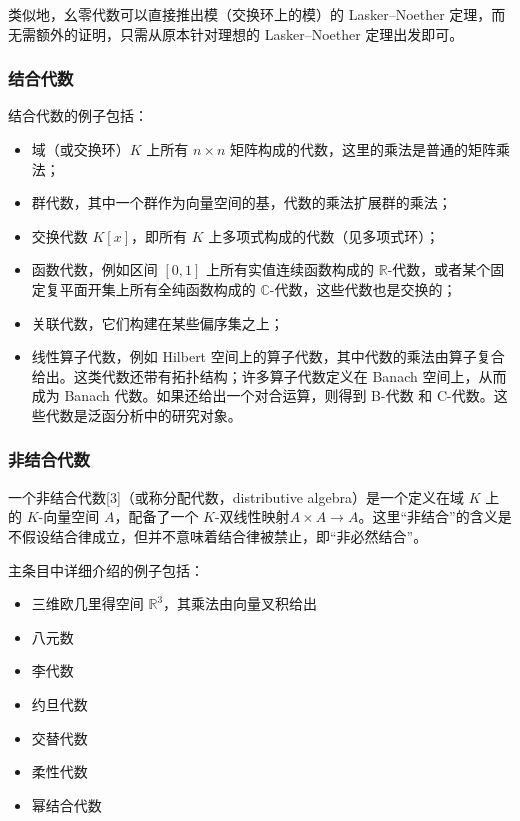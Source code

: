 类似地，幺零代数可以直接推出模（交换环上的模）的 Lasker–Noether 定理，而无需额外的证明，只需从原本针对理想的 Lasker–Noether 定理出发即可。
\subsubsection{结合代数}
结合代数的例子包括：
\begin{itemize}
\item 域（或交换环）$K$ 上所有 $n \times n$ 矩阵构成的代数，这里的乘法是普通的矩阵乘法；
\item 群代数，其中一个群作为向量空间的基，代数的乘法扩展群的乘法；
\item 交换代数 $K[x]$，即所有 $K$ 上多项式构成的代数（见多项式环）；
\item 函数代数，例如区间 $[0,1]$ 上所有实值连续函数构成的 $\mathbb{R}$-代数，或者某个固定复平面开集上所有全纯函数构成的 $\mathbb{C}$-代数，这些代数也是交换的；
\item 关联代数，它们构建在某些偏序集之上；
\item 线性算子代数，例如 Hilbert 空间上的算子代数，其中代数的乘法由算子复合给出。这类代数还带有拓扑结构；许多算子代数定义在 Banach 空间上，从而成为 Banach 代数。如果还给出一个对合运算，则得到 B\*-代数 和 C\*-代数。这些代数是泛函分析中的研究对象。
\end{itemize}
\subsubsection{非结合代数}
一个非结合代数[3]（或称分配代数，distributive algebra）是一个定义在域 $K$ 上的 $K$-向量空间 $A$，配备了一个 $K$-双线性映射$A \times A \to A$。这里“非结合”的含义是不假设结合律成立，但并不意味着结合律被禁止，即“非必然结合”。

主条目中详细介绍的例子包括：
\begin{itemize}
\item 三维欧几里得空间 $\mathbb{R}^3$，其乘法由向量叉积给出
\item 八元数
\item 李代数
\item 约旦代数
\item 交替代数
\item 柔性代数
\item 幂结合代数
\end{itemize}
